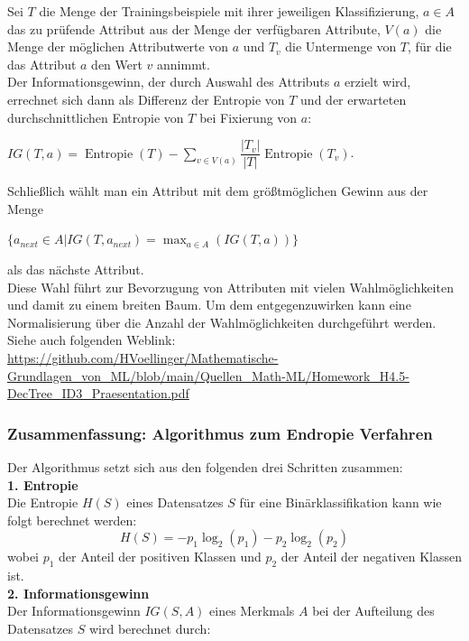 \documentclass[12pt]{article}
\begin{document}
Sei $ T $ die Menge der Trainingsbeispiele mit ihrer jeweiligen Klassifizierung, $ a \in A $ das zu prüfende Attribut aus der Menge der verfügbaren Attribute, $ V(a) $ die Menge der möglichen Attributwerte von $ a $ und $ T_ v$ die Untermenge von $ T $, für die das Attribut $ a $ den Wert $ v $ annimmt. \\
Der Informationsgewinn, der durch Auswahl des Attributs $ a $ erzielt wird, errechnet sich dann als Differenz der Entropie von $ T $ und der erwarteten durchschnittlichen Entropie von $ T $ bei Fixierung von $ a $:\\
\begin{center}
$ IG(T, a) = \operatorname{Entropie}(T) - \sum_{v \in V(a)} \dfrac{|T_v|}{|T|} \operatorname{Entropie} (T_v) $. \\
\end{center}
Schließlich wählt man ein Attribut mit dem größtmöglichen Gewinn aus der Menge 
\begin{center} 
$\lbrace a_{next} \in A | IG(T, a_{next}) = \max_{a \in A}(IG(T, a)) \rbrace $ 
\end{center}
als das nächste Attribut.\\[0.2cm]
Diese Wahl führt zur Bevorzugung von Attributen mit vielen Wahlmöglichkeiten und damit zu einem breiten Baum. Um dem entgegenzuwirken kann eine Normalisierung über die Anzahl der Wahlmöglichkeiten durchgeführt werden.\\
Siehe auch folgenden Weblink:\\
\url{https://github.com/HVoellinger/Mathematische-Grundlagen_von_ML/blob/main/Quellen_Math-ML/Homework_H4.5-DecTree_ID3_Praesentation.pdf}\\[0.2cm]
%
\subsubsection{Zusammenfassung: Algorithmus zum Endropie Verfahren}
%
Der Algorithmus setzt sich aus den folgenden drei Schritten zusammen:\\
\textbf{1. Entropie}\\
%
Die Entropie \( H(S) \) eines Datensatzes \( S \) für eine Binärklassifikation kann wie folgt berechnet werden:
%
\[
H(S) = -p_1 \log_2(p_1) - p_2 \log_2(p_2)
\]
%
wobei \( p_1 \) der Anteil der positiven Klassen und \( p_2 \) der Anteil der negativen Klassen ist.\\
%
\textbf{2. Informationsgewinn}\\
%
Der Informationsgewinn \( IG(S, A) \) eines Merkmals \( A \) bei der Aufteilung des Datensatzes \( S \) wird berechnet durch:
\end{document}
